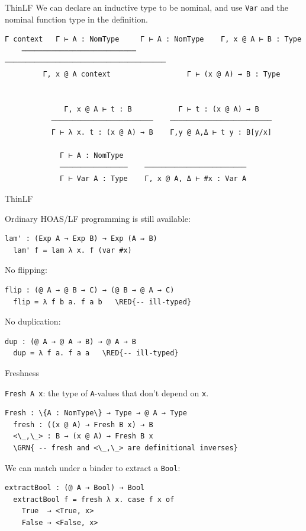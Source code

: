 \documentclass[dvipsnames,aspectratio=169]{beamer}
\newcommand{\vsp}{\vspace{1em}}
\theoremstyle{remark}
\newcommand{\RED}[1]{{\color{BrickRed} #1}}
\newcommand{\GRN}[1]{{\color{OliveGreen} #1}}
\begin{document}
\begin{frame}[fragile]{ThinLF}
We can declare an inductive type to be nominal, and use \texttt{Var} and
the nominal function type in the definition.
\vsp
\begin{Verbatim}[commandchars=\\\{\}]
    Γ context   Γ ⊢ A : NomType     Γ ⊢ A : NomType    Γ, x @ A ⊢ B : Type
    ───────────────────────────     ──────────────────────────────────────
         Γ, x @ A context                  Γ ⊢ (x @ A) → B : Type


              Γ, x @ A ⊢ t : B           Γ ⊢ t : (x @ A) → B
           ────────────────────────    ────────────────────────
           Γ ⊢ λ x. t : (x @ A) → B    Γ,y @ A,Δ ⊢ t y : B[y/x]

             Γ ⊢ A : NomType
             ────────────────    ────────────────────────
             Γ ⊢ Var A : Type    Γ, x @ A, Δ ⊢ #x : Var A
\end{Verbatim}
\vsp

\end{frame}

\begin{frame}[fragile]{ThinLF}

Ordinary HOAS/LF programming is still available:
\begin{Verbatim}[commandchars=\\\{\}]
  lam' : (Exp A → Exp B) → Exp (A ⇒ B)
  lam' f = lam λ x. f (var #x)
\end{Verbatim}
\vsp
No flipping:
\begin{Verbatim}[commandchars=\\\{\}]
  flip : (@ A → @ B → C) → (@ B → @ A → C)
  flip = λ f b a. f a b   \RED{-- ill-typed}
\end{Verbatim}
\vsp
No duplication:
\begin{Verbatim}[commandchars=\\\{\}]
  dup : (@ A → @ A → B) → @ A → B
  dup = λ f a. f a a   \RED{-- ill-typed}
\end{Verbatim}
\end{frame}

\begin{frame}[fragile]{Freshness}

\texttt{Fresh A x}: the type of \texttt{A}-values that
don't depend on \texttt{x}.
\vsp

\begin{Verbatim}[commandchars=\\\{\}]
  Fresh : \{A : NomType\} → Type → @ A → Type
  fresh : ((x @ A) → Fresh B x) → B
  <\_,\_> : B → (x @ A) → Fresh B x
  \GRN{ -- fresh and <\_,\_> are definitional inverses}
\end{Verbatim}
\vsp

We can match under a binder to extract a \texttt{Bool}:
\begin{Verbatim}[commandchars=\\\{\}]
  extractBool : (@ A → Bool) → Bool
  extractBool f = fresh λ x. case f x of
    True  → <True, x>
    False → <False, x>
\end{Verbatim} 
\end{frame}
\end{document}
